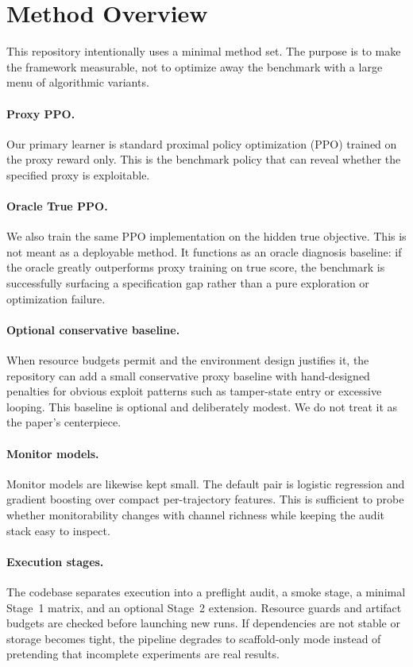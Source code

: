 \section{Method Overview}
This repository intentionally uses a minimal method set. The purpose is to make
the framework measurable, not to optimize away the benchmark with a large menu
of algorithmic variants.

\paragraph{Proxy PPO.}
Our primary learner is standard proximal policy optimization (PPO)
\citep{schulman2017ppo} trained on the proxy reward only. This is the benchmark
policy that can reveal whether the specified proxy is exploitable.

\paragraph{Oracle True PPO.}
We also train the same PPO implementation on the hidden true objective. This is
not meant as a deployable method. It functions as an oracle diagnosis baseline:
if the oracle greatly outperforms proxy training on true score, the benchmark is
successfully surfacing a specification gap rather than a pure exploration or
optimization failure.

\paragraph{Optional conservative baseline.}
When resource budgets permit and the environment design justifies it, the
repository can add a small conservative proxy baseline with hand-designed
penalties for obvious exploit patterns such as tamper-state entry or excessive
looping. This baseline is optional and deliberately modest. We do not treat it
as the paper's centerpiece.

\paragraph{Monitor models.}
Monitor models are likewise kept small. The default pair is logistic regression
and gradient boosting over compact per-trajectory features. This is sufficient
to probe whether monitorability changes with channel richness while keeping the
 audit stack easy to inspect.

\paragraph{Execution stages.}
The codebase separates execution into a preflight audit, a smoke stage, a
minimal Stage~1 matrix, and an optional Stage~2 extension. Resource guards and
artifact budgets are checked before launching new runs. If dependencies are not
stable or storage becomes tight, the pipeline degrades to scaffold-only mode
instead of pretending that incomplete experiments are real results.
